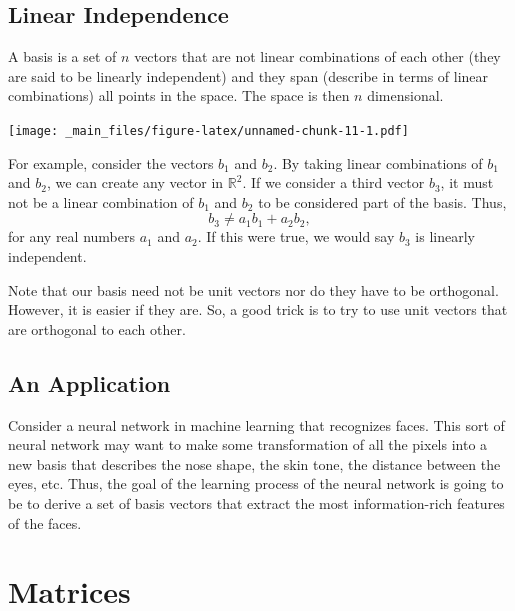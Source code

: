 \documentclass[
]{book}
\theoremstyle{definition}
\theoremstyle{definition}
\theoremstyle{definition}
\theoremstyle{definition}
\theoremstyle{remark}
\begin{document}
\hypertarget{linear-independence}{%
\subsection{Linear Independence}\label{linear-independence}}

A basis is a set of \(n\) vectors that are not linear combinations of each other (they are said to be linearly independent) and they span (describe in terms of linear combinations) all points in the space. The space is then \(n\) dimensional.

\texttt{[image: \_main\_files/figure-latex/unnamed-chunk-11-1.pdf]}

For example, consider the vectors \(b_1\) and \(b_2\). By taking linear combinations of \(b_1\) and \(b_2\), we can create any vector in \(\mathbb{R}^2\). If we consider a third vector \(b_3\), it must not be a linear combination of \(b_1\) and \(b_2\) to be considered part of the basis. Thus, \[b_3 \not = a_1 b_1 + a_2 b_2,\] for any real numbers \(a_1\) and \(a_2\). If this were true, we would say \(b_3\) is linearly independent.

Note that our basis need not be unit vectors nor do they have to be orthogonal. However, it is easier if they are. So, a good trick is to try to use unit vectors that are orthogonal to each other.

\hypertarget{an-application}{%
\subsection{An Application}\label{an-application}}

Consider a neural network in machine learning that recognizes faces. This sort of neural network may want to make some transformation of all the pixels into a new basis that describes the nose shape, the skin tone, the distance between the eyes, etc. Thus, the goal of the learning process of the neural network is going to be to derive a set of basis vectors that extract the most information-rich features of the faces.

\hypertarget{matrices}{%
\section{Matrices}\label{matrices}}
\end{document}
